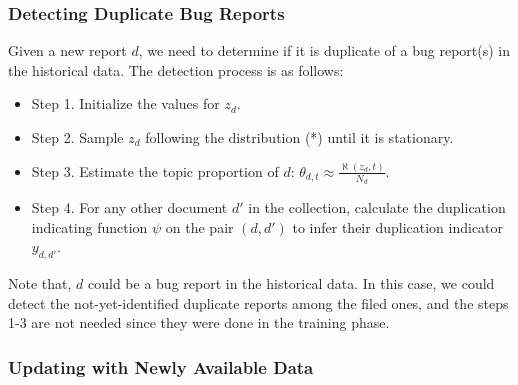 
\subsubsection{Detecting Duplicate Bug Reports}

Given a new report $d$, we need to determine if it is
duplicate of a bug report(s) in the historical data. The
detection process is as follows:

\begin{itemize}

\item Step 1. Initialize the values for $z_d$.

\item Step 2. Sample $z_d$ following the distribution (*) until it is
stationary.

\item Step 3. Estimate the topic proportion of $d$: $\theta_{d,t} \approx
\frac {\aleph(z_d,t)} {N_d}$.

\item Step 4. For any other document $d'$ in the collection, calculate the
duplication indicating function $\psi$ on the pair $(d, d')$ to infer
their duplication indicator $y_{d,d'}$.

\end{itemize}

Note that, $d$ could be a bug report in the historical data. In this
case, we could detect the not-yet-identified duplicate reports among
the filed ones, and the steps 1-3 are not needed since they were
done in the training phase.


\subsubsection{Updating with Newly Available Data}
\label{updating-algo}


